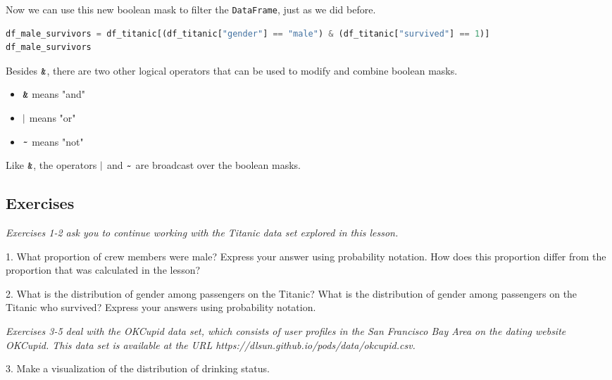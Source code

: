 Now we can use this new boolean mask to filter the \verb|DataFrame|, just as we did before.

\begin{lstlisting}[language=Python]
df_male_survivors = df_titanic[(df_titanic["gender"] == "male") & (df_titanic["survived"] == 1)]
df_male_survivors
\end{lstlisting}




Besides $\verb|&|$, there are two other logical operators that can be used to modify and combine boolean masks.
\begin{itemize}
\item 
$\verb|&|$ means "and"

\item 
$\verb|||$ means "or"

\item 
$\verb|~|$ means "not"

\end{itemize}

Like $\verb|&|$, the operators $\verb|||$ and $\verb|~|$ are broadcast over the boolean masks.



\subsection{Exercises}\label{2.1.3}



\textit{Exercises 1-2 ask you to continue working with the Titanic data set explored in this lesson.}



1. What proportion of crew members were male? Express your answer using probability notation. How does this proportion differ from the proportion that was calculated in the lesson?



2. What is the distribution of gender among passengers on the Titanic? What is the distribution of gender among passengers on the Titanic who survived? Express your answers using probability notation.



\textit{Exercises 3-5 deal with the OKCupid data set, which consists of user profiles in the San Francisco Bay Area on the dating website OKCupid. This data set is available at the URL https://dlsun.github.io/pods/data/okcupid.csv.}



3. Make a visualization of the distribution of drinking status.



